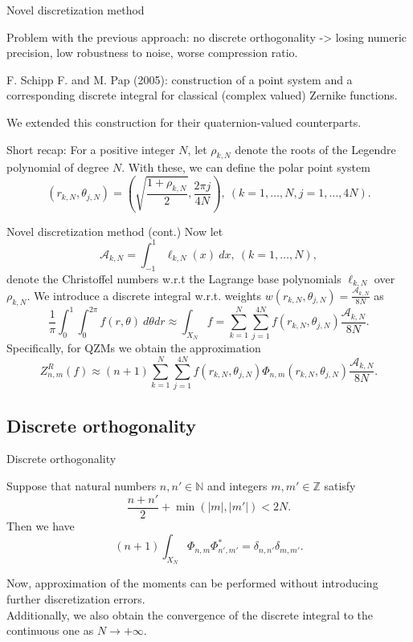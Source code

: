 \documentclass{beamer}
\newcommand{\N}{\mathbb{N}}
\newcommand{\Z}{\mathbb{Z}}
\def\N{{\mathbb N}}
\def\Z{{\mathbb Z}}
\begin{document}
\begin{frame}{Novel discretization method}
\vskip 5mm

    Problem with the previous approach: no discrete orthogonality -> losing numeric precision, low robustness to noise, worse compression ratio.

    F. Schipp F. and M. Pap (2005): construction of a point system and a corresponding discrete integral for classical (complex valued) Zernike functions.

    We extended this construction for their quaternion-valued counterparts.

    Short recap: For a positive integer $N$, let $\rho_{k,N}$ denote the roots of the Legendre polynomial of degree $N$. With these, we can define the polar point system
    $$(r_{k,N}, \theta_{j,N}) = \left(\sqrt{\frac{1+\rho_{k,N}}{2}} , \frac{2\pi j}{4N} \right), \ (k=1,\ldots,N,j=1,\ldots,4N).$$
    
\end{frame}

\begin{frame}{Novel discretization method (cont.)}
    \vskip 5mm
    Now let $$\mathcal{A}_{k,N} = \int_{-1}^{1} \ell_{k,N}(x)\ dx, \ (k=1,\ldots,N),$$ denote the Christoffel numbers w.r.t the Lagrange base polynomials $\ell_{k,N}$ over $\rho_{k,N}$.
    We introduce a discrete integral w.r.t. weights $w(r_{k,N},\theta_{j,N}) = \frac{\mathcal{A}_{k,N}}{8N}$ as
    $$\frac{1}{\pi} \int_{0}^1 \int_0^{2\pi} f(r,\theta)\ d\theta dr \approx \int_{X_N} f = \sum_{k=1}^{N} \sum_{j=1}^{4N} f(r_{k,N},\theta_{j,N}) \frac{\mathcal{A}_{k,N}}{8N}.$$
    Specifically, for QZMs we obtain the approximation
    $$Z^R_{n,m}(f) \approx (n+1)\sum_{k=1}^{N}\sum_{j=1}^{4N}f(r_{k,N},\theta_{j,N})\Phi_{n,m}(r_{k,N},\theta_{j,N})\frac{\mathcal{A}_{k,N}}{8N}.$$
\end{frame}

\subsection{Discrete orthogonality}
\begin{frame}{Discrete orthogonality}
\begin{theorem}
    Suppose that natural numbers $n, n' \in \N$ and integers $m, m' \in \Z$ satisfy $$\frac{n + n'}{2} + \min(|m|,|m'|) < 2N.$$
    Then we have $$(n + 1)\int_{X_N}\Phi_{n,m}\Phi_{n',m'}^* = \delta_{n,n'}\delta_{m,m'}.$$
\end{theorem}
Now, approximation of the moments can be performed without introducing further discretization errors. \\
Additionally, we also obtain the convergence of the discrete integral to the continuous one as $N\to+\infty$.
\end{frame}
\end{document}
